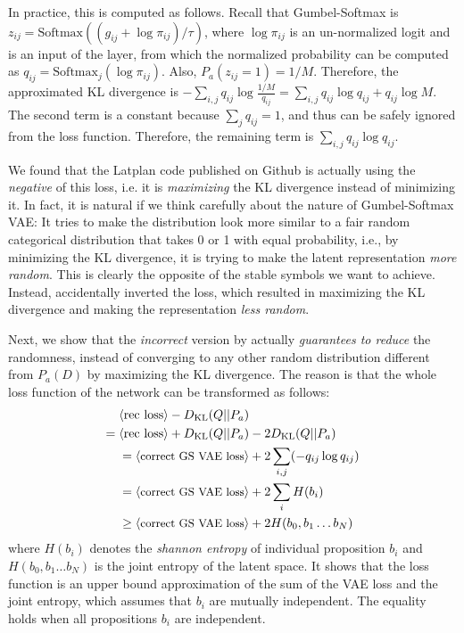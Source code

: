 In practice, this is computed as follows.
Recall that Gumbel-Softmax is $z_{ij} = \text{Softmax}((g_{ij}+\log \pi_{ij})/\tau)$,
where $\log \pi_{ij}$ is an un-normalized logit and is an input of the layer,
from which the normalized probability can be computed as $q_{ij}=\text{Softmax}_j(\log \pi_{ij})$.
Also, $P_a(z_{ij}=1)= 1/M$.
% 
Therefore, the approximated KL divergence is
$-\sum_{i,j} q_{ij} \log \frac{1/M}{q_{ij}} = \sum_{i,j} q_{ij} \log q_{ij} + q_{ij} \log M$.
The second term is a constant because $\sum_j q_{ij} = 1$,
and thus can be safely ignored from the loss function.
Therefore, the remaining term is $\sum_{i,j} q_{ij} \log q_{ij}$.

We found that the Latplan code published on Github is actually using the \emph{negative} of this loss,
i.e. it is \emph{maximizing} the KL divergence instead of minimizing it.
In fact, it is natural if we think carefully about the nature of Gumbel-Softmax VAE:
It tries to make the distribution look more similar to a fair random categorical distribution
that takes 0 or 1 with equal probability, i.e., by minimizing the KL divergence, it is trying to make the
latent representation \emph{more random}. This is clearly the opposite of the stable symbols we want to achieve.
Instead, \citeauthor{Asai2018} accidentally inverted the loss, which resulted in
maximizing the KL divergence and making the representation \emph{less random}.

Next, we show that the \emph{incorrect} version by \citeauthor{Asai2018} 
actually \emph{guarantees to reduce} the randomness,
instead of converging to any other random distribution different from $P_a(D)$ by maximizing the KL divergence.
The reason is that the whole loss function of the network can be transformed as follows:
\begin{align*} 
 \brackets{\text{rec loss}}-D_{\text{KL}}(Q||P_a)&                                         \\
=\brackets{\text{rec loss}}+D_{\text{KL}}(Q||P_a)&- 2 D_{\text{KL}}(Q||P_a)                \\
=\brackets{\text{\small correct GS VAE loss}}& + 2 \sum_{i,j} (- q_{ij} \log q_{ij})      \\
=\brackets{\text{\small correct GS VAE loss}}& + 2 \sum_{i} H(b_i)                        \\
\geq\brackets{\text{\small correct GS VAE loss}}& + 2 H(b_0,b_1\ldots b_N)
\end{align*}
where $H(b_i)$ denotes the \emph{shannon entropy} of individual proposition $b_i$ and
$H(b_0,b_1\ldots b_N)$ is the joint entropy of the latent space.
It shows that the loss function is an upper bound approximation of the sum of the VAE loss and the joint entropy,
which assumes that $b_i$ are mutually independent.
The equality holds when all propositions $b_i$ are independent.

